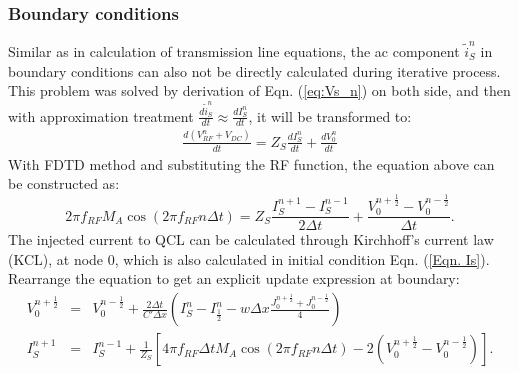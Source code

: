 \documentclass[11pt,final]{scrbook}
\begin{document}
\subsubsection{Boundary conditions}
Similar as in calculation of transmission line equations, the ac component $\tilde{ i }_{ S  }^{ n }$ in boundary conditions can also not be directly calculated during iterative process. This problem was solved by derivation of Eqn. (\ref{eq:Vs_n}) on both side, and then with approximation treatment $\frac{d\tilde{ i }_{ S }^{ n }}{dt}\approx \frac{d{ I }_{ S }^{ n }}{dt}$, it will be transformed to:
\begin{eqnarray}
\frac { d({ V }_{ RF }^{ n }+{ V }_{ DC }) }{ dt } ={ Z }_{ S }\frac { d { I } _{ S }^{ n } }{ dt } +\frac { d{ V }_{ 0 }^{ n } }{ dt } 
\end{eqnarray}
With FDTD method and substituting the RF function, the equation above can be constructed as:
\begin{equation}
2\pi f_{RF}M_{A}\cos(2\pi f_{RF}n\Delta t)=Z_{S}\frac{{ I }_{ S  }^{ n+1 }-{ I }_{ S }^{ n-1 }}{2\Delta t}+\frac{V_{0}^{n+\frac{1}{2}}-V_{0}^{n-\frac{1}{2}}}{\Delta t}.
\end{equation}
The injected current to QCL can be calculated through Kirchhoff's current law (KCL), at node 0, which is also calculated in initial condition Eqn. (\ref{Eqn. Is}). Rearrange the equation to get an explicit update expression at boundary:
\begin{eqnarray}
{ V }_{ 0 }^{ n+\frac{1}{2} } &=& { V }_{ 0 }^{ n-\frac{1}{2} } + \frac{ 2\Delta t }{ C'\Delta x } ({ I }_{ S }^{ n}-{ I }_{ \frac{1}{2} }^{ n } - w\Delta x\frac{{J}_{0}^{n+\frac{1}{2}}+{J}_{0}^{n-\frac{1}{2}}}{4})\\
{ I }_{ S }^{ n+1 } &=& { I }_{ S }^{ n-1 }+\frac{1}{Z_{S}}[4\pi f_{RF}\Delta t M_{A}\cos(2\pi f_{RF}n\Delta t)-2(V_{0}^{n+\frac{1}{2}}-V_{0}^{n-\frac{1}{2}})].
\end{eqnarray}
\end{document}
